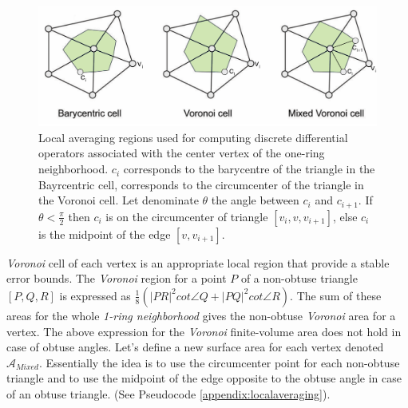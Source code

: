 \begin{figure}[!h]
    \centering
    \includegraphics[scale=0.35]{images/localregions.png}
    \caption{Local averaging regions used for computing discrete differential operators associated with the center vertex of the one-ring neighborhood.
    $c_i$ corresponds to the barycentre of the triangle in the Bayrcentric cell, corresponds to the circumcenter of the triangle in the Voronoi cell. Let denominate $\theta$ the angle between $c_i$ and $c_{i+1}$. If $\theta < \frac{\pi}{2}$ then $c_i$ is on the circumcenter of triangle $[v_i, v, v_{i+1}]$, else $c_i$ is the midpoint of the edge $[v, v_{i+1}]$.  \cite{polygonmeshprocessing}} \label{fig:localregions}
\end{figure}
\textit{Voronoi} cell of each vertex is an appropriate local region that provide a stable error bounds.
The \textit{Voronoi} region for a point $P$ of a non-obtuse triangle $[P, Q, R]$ is expressed as $\frac{1}{8}(| PR|^2 cot \angle Q + |PQ |^2 cot \angle R)$. The sum of these areas for the whole \textit{1-ring neighborhood} gives the non-obtuse \textit{Voronoi} area for a vertex. The above expression for the \textit{Voronoi} finite-volume area does not hold in case of obtuse angles. Let's define a new surface area for each vertex denoted $\mathcal{A}_{Mixed}$. Essentially the idea is to use the circumcenter point for each non-obtuse triangle and to use the midpoint of the edge opposite to the obtuse angle in case of an obtuse triangle. (See Pseudocode \ref{appendix:localaveraging}). \cite{meshlab}

